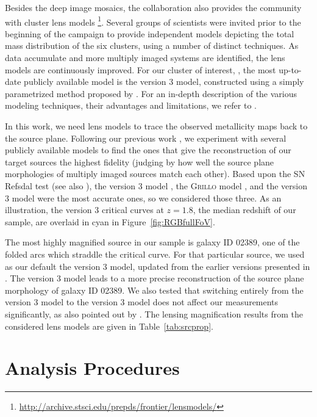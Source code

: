 Besides the deep image mosaics, the \hff collaboration also provides
the community with cluster lens models
\footnote{\url{http://archive.stsci.edu/prepds/frontier/lensmodels/}}.
Several groups of scientists were invited prior to the beginning of
the campaign to provide independent models depicting the total mass distribution
of the six \hff clusters, using a number of distinct techniques.
As data accumulate and more multiply imaged systems are identified, the lens models are continuously improved.
For our cluster of interest, \clyi, the most up-to-date publicly available model is the \glafic version 3 model,
constructed using a simply parametrized method proposed by \citet{2010PASJ...62.1017O}.
For an in-depth description of the various modeling techniques, their advantages and limitations, we
refer to \citet{2015arXiv151005750T,Meneghetti:2016wg}.

In this work, we need lens models to trace the observed metallicity
maps back to the source plane. Following our previous work \citep{2015AJ....149..107J},
we experiment with several publicly available models to find the ones that give the
reconstruction of our target sources the highest fidelity (judging by
how well the source plane morphologies of multiply imaged sources
match each other). Based upon the SN Refsdal test (see also \citet{2015arXiv151204654K}),
the \glafic version 3 model \citep{2015arXiv151006400K}, the \textsc{Grillo} model \citep{2016ApJ...822...78G}, and
the \SJ version 3 model were the most accurate ones, so we considered those three.
As an illustration, the \glafic version 3 critical curves at $z=1.8$, the
median redshift of our \mg sample, are overlaid in cyan in Figure~\ref{fig:RGBfullFoV}.

The most highly magnified source in our sample is galaxy ID 02389, one of
the folded arcs which straddle the critical curve. For that particular
source, we used as our default the \SJ version 3 model, updated from the earlier versions
presented in \citet{Johnson:2014cf,Sharon:2015hr}. The \SJ version 3 model leads
to a more precise reconstruction of the source plane morphology of
galaxy ID 02389.  We also tested that switching entirely from the
\glafic version 3 model to the \SJ version 3 model does not affect our
measurements significantly, as also pointed out by \citet{2015arXiv150901279L}.
The lensing magnification results from the considered lens models are given in
Table~\ref{tab:srcprop}.


\section{Analysis Procedures}\label{sect:analysis}

